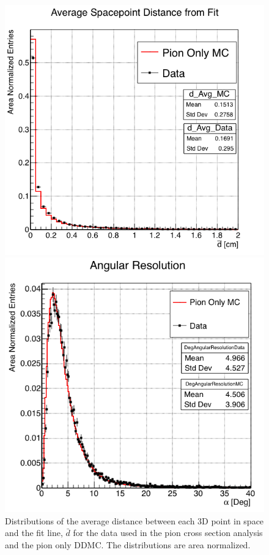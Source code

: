 \begin{figure}[ht]
\begin{minipage}[t]{0.45\linewidth}
\centering
\includegraphics[width=\textwidth]{Chapter-5/Images/cDAvg.png}
\caption[]{Distributions of the average distance between each 3D point in space and the fit line,  $\bar d$ for the data used in the pion cross section analysis and the pion only DDMC. The distributions are area normalized. } \label{fig:Chi2AllPts}
\end{minipage}
\hspace{0.5cm}
\begin{minipage}[t]{0.45\linewidth}
\centering
\includegraphics[width=\textwidth]{Chapter-5/Images/cTrackingDeg.png}

\end{minipage}
\end{figure}
